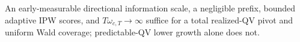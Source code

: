 An early-measurable directional information scale, a negligible prefix, bounded adaptive IPW scores, and \(T\omega_{c,T}\to\infty\) suffice for a total realized-QV pivot and uniform Wald coverage; predictable-QV lower growth alone does not.